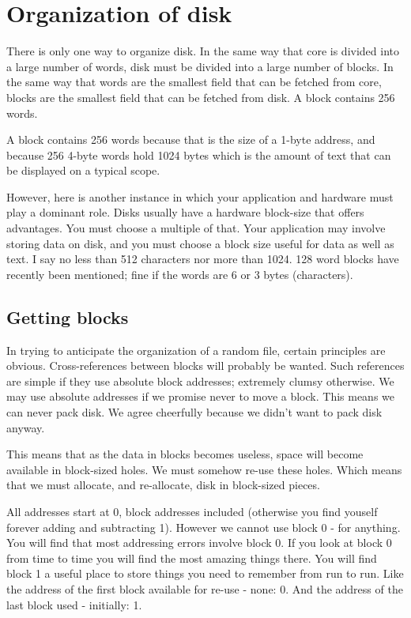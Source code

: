 \documentclass[b5paper, oneside]{book}
\begin{document}
\section{Organization of disk}
There is only one way to organize disk. In the same way that core is divided into a large number of words, disk must be divided into a large number of blocks. In the same way that words are the smallest field that can be fetched from core, blocks are the smallest field that can be fetched from disk. A block contains 256 words.

A block contains 256 words because that is the size of a 1-byte address, and because 256 4-byte words hold 1024 bytes which is the amount of text that can be displayed on a typical scope.

However, here is another instance in which your application and hardware must play a dominant role. Disks usually have a hardware block-size that offers advantages. You must choose a multiple of that. Your application may involve storing data on disk, and you must choose a block size useful for data as well as text. I say no less than 512 characters nor more than 1024. 128 word blocks have recently been mentioned; fine if the words are 6 or 3 bytes (characters).

\subsection{Getting blocks}
In trying to anticipate the organization of a random file, certain principles are obvious. Cross-references between blocks will probably be wanted. Such references are simple if they use absolute block addresses; extremely clumsy otherwise. We may use absolute addresses if we promise never to move a block. This means we can never pack disk. We agree cheerfully because we didn't want to pack disk anyway.

This means that as the data in blocks becomes useless, space will become available in block-sized holes. We must somehow re-use these holes. Which means that we must allocate, and re-allocate, disk in block-sized pieces.

All addresses start at 0, block addresses included (otherwise you find youself forever adding and subtracting 1). However we cannot use block 0 - for anything. You will find that most addressing errors involve block 0. If you look at block 0 from time to time you will find the most amazing things there. You will find block 1 a useful place to store things you need to remember from run to run. Like the address of the first block available for re-use - none: 0. And the address of the last block used - initially: 1.
\end{document}
